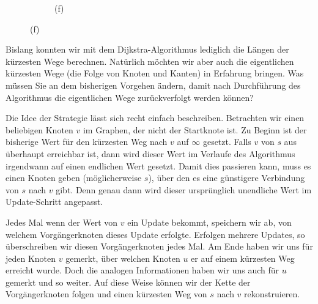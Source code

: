 \begin{myexercise}
\begin{myanswer}
\begin{figure}[H]
\begin{subfigure}[b]{0.4\textwidth}
{
				}%
				\caption*{(f)}
			\end{subfigure}
		\end{figure}
	\end{myanswer}
\end{myexercise}


\begin{myexercise}\label{aufgabe:206}
	Bislang konnten wir mit dem Dijkstra-Algorithmus lediglich die Längen der kürzesten Wege berechnen. Natürlich möchten wir aber auch die eigentlichen kürzesten Wege (die Folge von Knoten und Kanten) in Erfahrung bringen. Was müssen Sie an dem bisherigen Vorgehen ändern, damit nach Durchführung des Algorithmus die eigentlichen Wege zurückverfolgt werden können?
	\begin{myanswer}\label{aufgabe:206-sol}
		Die Idee der Strategie lässt sich recht einfach beschreiben. Betrachten wir einen beliebigen Knoten $v$ im Graphen, der nicht der Startknote ist. Zu Beginn ist der bisherige Wert für den kürzesten Weg nach $v$ auf $\infty$ gesetzt. Falls $v$ von $s$ aus überhaupt erreichbar ist, dann wird dieser Wert im Verlaufe des Algorithmus irgendwann auf einen endlichen Wert gesetzt. Damit dies passieren kann, muss es einen Knoten geben (möglicherweise $s$), über den es eine günstigere Verbindung von $s$ nach $v$ gibt. Denn genau dann wird dieser ursprünglich unendliche Wert im Update-Schritt angepasst.

		Jedes Mal wenn der Wert von $v$ ein Update bekommt, speichern wir ab, von welchem Vorgängerknoten dieses Update erfolgte. Erfolgen mehrere Updates, so überschreiben wir diesen Vorgängerknoten jedes Mal. Am Ende haben wir uns für jeden Knoten $v$ gemerkt, über welchen Knoten $u$ er auf einem kürzesten Weg erreicht wurde. Doch die analogen Informationen haben wir uns auch für $u$ gemerkt und so weiter. Auf diese Weise können wir der Kette der Vorgängerknoten folgen und einen kürzesten Weg von $s$ nach $v$ rekonstruieren.
	\end{myanswer}
\end{myexercise}

